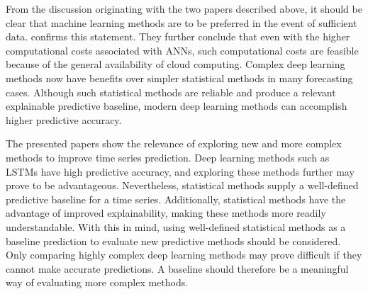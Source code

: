 From the discussion originating with the two papers described above,
it should be clear that machine learning methods are to be preferred in the event of sufficient data.
\cite{Hewamalage2021} confirms this statement. They further conclude that even with the higher computational costs
associated with ANNs, such computational costs are feasible because of the general availability of cloud computing.
Complex deep learning methods now have benefits over simpler statistical methods in many forecasting cases.
Although such statistical methods are reliable and produce a relevant explainable predictive baseline,
modern deep learning methods can accomplish higher predictive accuracy.

The presented papers show the relevance of exploring new and more complex methods to improve time series prediction.
Deep learning methods such as LSTMs have high predictive accuracy,
and exploring these methods further may prove to be advantageous.
Nevertheless, statistical methods supply a well-defined predictive baseline for a time series.
Additionally, statistical methods have the advantage of improved explainability,
making these methods more readily understandable.
With this in mind, using well-defined statistical methods as a baseline prediction to evaluate new predictive methods should be considered.
Only comparing highly complex deep learning methods may prove difficult if they cannot make accurate predictions.
A baseline should therefore be a meaningful way of evaluating more complex methods.

\iffalse
  The paper \cite{Bandara2017} points out that in non-stationary time series, the distant past is typically less
  useful for forecast, as underlying patterns and relationships will have changed in the meantime.

  In \Cref{section:RelatedWork:forecasting-ecommerce}
  we highlighted ANNs ability to outperform statistical methods when macro-economic
  conditions were unstable.
  In \Cref{section:RelatedWork:Model-structure} we mentioned how statistical models
  potentially missed the bigger picture in a domain of many related time series.
  These findings makes it clear to us that limiting our solution to a statistical method
  will be a mistake, and exploring a more complicated ANN model seems beneficial.
  However, a need for a baseline model in order to compare the results of the ANN model,
  a statistical method, like SARIMA could be useful.
\fi
